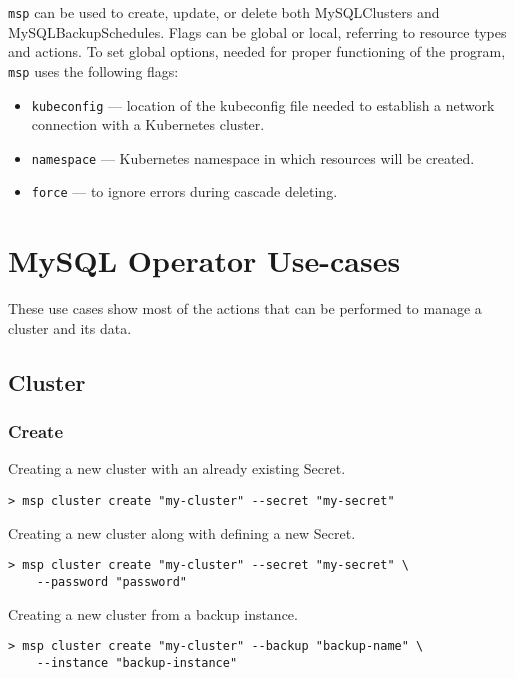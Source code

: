 \texttt{msp} can be used to create, update, or delete both MySQLClusters
and MySQLBackupSchedules. Flags can be global or local, referring
to resource types and actions. To set global options, needed for proper
functioning of the program, \texttt{msp} uses the following flags:
\begin{itemize}
    \item \texttt{kubeconfig} --- location of the kubeconfig file needed to
        establish a network connection with a Kubernetes cluster.
    \item \texttt{namespace} --- Kubernetes namespace in which resources will be created.
    \item \texttt{force} --- to ignore errors during cascade deleting.
\end{itemize}


\section{MySQL Operator Use-cases}

These use cases show most of the actions that can be performed to manage a cluster and its data.

\subsection{Cluster}

\subsubsection*{Create}
\noindent Creating a new cluster with an already existing Secret.

\begin{lstlisting}
> msp cluster create "my-cluster" --secret "my-secret"
\end{lstlisting}

\noindent Creating a new cluster along with defining a new Secret.

\begin{lstlisting}
> msp cluster create "my-cluster" --secret "my-secret" \
	--password "password"
\end{lstlisting}

\noindent Creating a new cluster from a backup instance.

\begin{lstlisting}
> msp cluster create "my-cluster" --backup "backup-name" \
	--instance "backup-instance"
\end{lstlisting}

